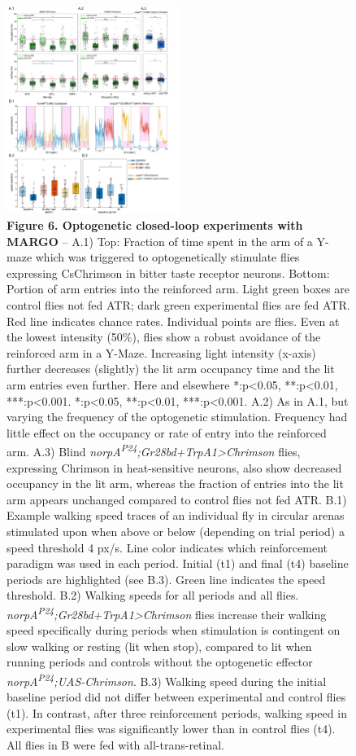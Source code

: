 \documentclass[10pt]{article}
\begin{document}
\clearpage
\begin{figure}[t!]
	\begin{center}
		\includegraphics[width=0.5\textwidth]{../figures/optogenetics_fig_sm.pdf}
	\end{center}
	\caption*{\footnotesize \textbf{Figure 6. Optogenetic closed-loop experiments with MARGO} -- A.1) Top: Fraction of time spent in the arm of a Y-maze which was triggered to optogenetically stimulate flies expressing CsChrimson in bitter taste receptor neurons. Bottom: Portion of arm entries into the reinforced arm. Light green boxes are control flies not fed ATR; dark green experimental flies are fed ATR. Red line indicates chance rates. Individual points are flies. Even at the lowest intensity (50\%), flies show a robust avoidance of the reinforced arm in a Y-Maze. Increasing light intensity (x-axis) further decreases (slightly) the lit arm occupancy time and the lit arm entries even further. Here and elsewhere *:p<0.05, **:p<0.01, ***:p<0.001. *:p<0.05, **:p<0.01, ***:p<0.001. 
	A.2) As in A.1, but varying the frequency of the optogenetic stimulation. Frequency had little effect on the occupancy or rate of entry into the reinforced arm. 
	A.3) Blind \textit{norpA\textsuperscript{P24};Gr28bd+TrpA1>Chrimson} flies, expressing Chrimson in heat-sensitive neurons, also show decreased occupancy in the lit arm, whereas the fraction of entries into the lit arm appears unchanged compared to control flies not fed ATR. 
	B.1) Example walking speed traces of an individual fly in circular arenas stimulated upon when above or below (depending on trial period) a speed threshold 4 px/s. Line color indicates which reinforcement paradigm was used in each period. Initial (t1) and final (t4) baseline periods are highlighted (see B.3). Green line indicates the speed threshold.
	B.2) Walking speeds for all periods and all flies. \textit{norpA\textsuperscript{P24};Gr28bd+TrpA1>Chrimson} flies increase their walking speed specifically during periods when stimulation is contingent on slow walking or resting (lit when stop), compared to lit when running periods and controls without the optogenetic effector \textit{norpA\textsuperscript{P24};UAS-Chrimson}.
	B.3) Walking speed during the initial baseline period did not differ between experimental and control flies (t1). In contrast, after three reinforcement periods, walking speed in experimental flies was significantly lower than in control flies (t4). 
	All flies in B were fed with all-trans-retinal.} 
\end{figure}
\end{document}
